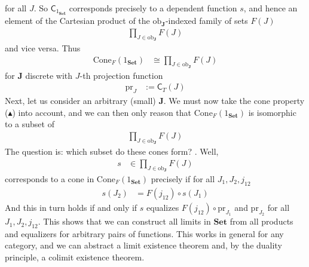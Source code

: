 for all $J$.
So $\mathsf{C}_{1_{\mathbf{Set}}}$ corresponds precisely to a dependent function $s$, and hence an element of the Cartesian product of the $\mathrm{ob}_{\mathbf{J}}$-indexed family of sets $F(J)$
\begin{align*}
  \prod_{J \in \mathrm{ob}_{\mathbf{J}}}
  F(J)
\end{align*}
and vice versa.
Thus
\begin{align*}
  \mathrm{Cone}_{F}(1_{\mathbf{Set}})
  &\cong
  \prod_{J \in \mathrm{ob}_{\mathbf{J}}}
  F(J)
\end{align*}
for $\mathbf{J}$ discrete with $J$-th projection function
\begin{align*}
  \mathrm{pr}_{J}
  &:=
  \mathsf{C}_{T}(J)
\end{align*}
Next, let us consider an arbitrary (small) $\mathbf{J}$.
We must now take the cone property ($\blacktriangle$) into account, and we can then only reason that $\mathrm{Cone}_{F}(1_{\mathbf{Set}})$ is isomorphic to a subset of
\begin{align*}
  \prod_{J \in \mathrm{ob}_{\mathbf{J}}}
  F(J)
\end{align*}
The question is: which subset do these cones form? .
Well,
\begin{align*}
  s
  &\in
  \prod_{J \in \mathrm{ob}_{\mathbf{J}}}
  F(J)
\end{align*}
corresponds to a cone in $\mathrm{Cone}_{F}(1_{\mathbf{Set}})$ precisely if for all $J_{1},J_{2},j_{12}$
\begin{align*}
  s(J_{2})
  &=
  F(j_{12})
  \circ
  s(J_{1})
\end{align*}
And this in turn holds if and only if $s$ equalizes $F(j_{12}) \circ \mathrm{pr}_{J_{1}}$ and $\mathrm{pr}_{J_{2}}$ for all $J_{1},J_{2},j_{12}$.
This shows that we can construct all limits in $\mathbf{Set}$ from all products and equalizers for arbitrary pairs of functions.
This works in general for any category, and we can abstract a limit existence theorem and, by the duality principle, a colimit existence theorem.
\\
